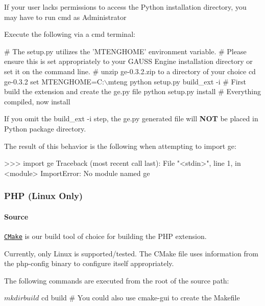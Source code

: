 If your user lacks permissions to access the Python installation directory, you may have to run {\ttfamily cmd} as Administrator

Execute the following via a {\ttfamily cmd} terminal\+:


\begin{DoxyCode}
# The setup.py utilizes the 'MTENGHOME' environment variable.
# Please ensure this is set appropriately to your GAUSS Engine installation directory or set it on the
       command line.
# unzip ge-0.3.2.zip to a directory of your choice
cd ge-0.3.2
set MTENGHOME=C:\(\backslash\)mteng
python setup.py build\_ext -i      # First build the extension and create the ge.py file
python setup.py install           # Everything compiled, now install
\end{DoxyCode}


If you omit the {\ttfamily build\+\_\+ext -\/i} step, the {\ttfamily ge.\+py} generated file will {\bfseries N\+OT} be placed in Python package directory.

The result of this behavior is the following when attempting to {\ttfamily import ge}\+:


\begin{DoxyCode}
>>> \textcolor{keyword}{import} ge
Traceback (most recent call last):
  File \textcolor{stringliteral}{"<stdin>"}, line 1, \textcolor{keywordflow}{in} <module>
ImportError: No module named ge
\end{DoxyCode}


\subsubsection*{P\+HP (Linux Only)}

\paragraph*{Source}

\href{http://www.cmake.org}{\tt C\+Make} is our build tool of choice for building the P\+HP extension.

Currently, only Linux is supported/tested. The C\+Make file uses information from the {\ttfamily php-\/config} binary to configure itself appropriately.

The following commands are executed from the root of the source path\+: \begin{DoxyVerb}$ mkdir build
$ cd build
# You could also use cmake-gui to create the Makefile
\end{DoxyVerb}


